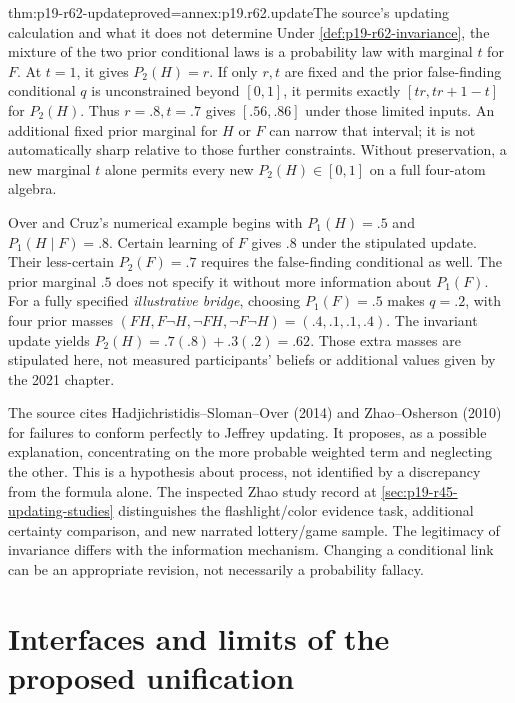 \begin{hbtheorem}{thm:p19-r62-update}{proved=annex:p19.r62.update}{The source's updating calculation and what it does not determine}
Under \cref{def:p19-r62-invariance}, the mixture of the two prior
conditional laws is a probability law with marginal \(t\) for \(F\).
At \(t=1\), it gives \(P_2(H)=r\). If only \(r,t\) are fixed
and the prior false-finding conditional \(q\) is unconstrained beyond
\([0,1]\), it permits exactly \([tr,tr+1-t]\) for \(P_2(H)\).
Thus \(r=.8,t=.7\) gives \([.56,.86]\) under those limited inputs.
An additional fixed prior marginal for \(H\) or \(F\) can narrow
that interval; it is not automatically sharp relative to those further
constraints. Without preservation, a new marginal \(t\) alone permits
every new \(P_2(H)\in[0,1]\) on a full four-atom algebra.
\end{hbtheorem}

Over and Cruz's numerical example begins with \(P_1(H)=.5\) and
\(P_1(H\mid F)=.8\). Certain learning of \(F\) gives \(.8\)
under the stipulated update. Their less-certain \(P_2(F)=.7\)
requires the false-finding conditional as well. The prior marginal
\(.5\) does not specify it without more information about \(P_1(F)\).
For a fully specified \emph{illustrative bridge}, choosing
\(P_1(F)=.5\) makes \(q=.2\), with four prior masses
\((FH,F\neg H,\neg FH,\neg F\neg H)=(.4,.1,.1,.4)\).
The invariant update yields \(P_2(H)=.7(.8)+.3(.2)=.62\).
Those extra masses are stipulated here, not measured participants' beliefs
or additional values given by the 2021 chapter.

The source cites Hadjichristidis--Sloman--Over (2014) and Zhao--Osherson
(2010) for failures to conform perfectly to Jeffrey updating. It proposes,
as a possible explanation, concentrating on the more probable weighted
term and neglecting the other. This is a hypothesis about process, not
identified by a discrepancy from the formula alone. The inspected Zhao
study record at \cref{sec:p19-r45-updating-studies} distinguishes the
flashlight/color evidence task, additional certainty comparison, and
new narrated lottery/game sample. The legitimacy of invariance differs
with the information mechanism. Changing a conditional link can be an
appropriate revision, not necessarily a probability fallacy.

\section{Interfaces and limits of the proposed unification}
\label{sec:p19-r62-interfaces}


